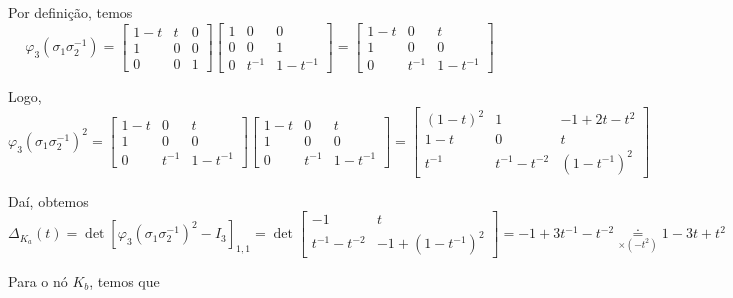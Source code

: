 	\par\vspace{0.3cm} Por definição, temos
	\begin{equation*}
	\varphi_3(\sigma_1\sigma_2^{-1}) = \begin{bmatrix}
	1-t & t & 0 \\
	1 & 0 & 0 \\
	0 & 0 & 1
	\end{bmatrix}\begin{bmatrix}
	1 & 0 & 0 \\
	0 & 0 & 1 \\
	0 & t^{-1} & 1-t^{-1}
	\end{bmatrix} = \begin{bmatrix}
	1-t & 0 & t \\
	1 & 0 & 0 \\
	0 & t^{-1} & 1-t^{-1}
	\end{bmatrix}
	\end{equation*}
	\par\vspace{0.3cm} Logo,
	\begin{equation*}
	\varphi_3(\sigma_1\sigma_2^{-1})^2 = \begin{bmatrix}
	1-t & 0 & t \\
	1 & 0 & 0 \\
	0 & t^{-1} & 1-t^{-1}
	\end{bmatrix}\begin{bmatrix}
	1-t & 0 & t \\
	1 & 0 & 0 \\
	0 & t^{-1} & 1-t^{-1}
	\end{bmatrix} = \begin{bmatrix}
	(1-t)^2 & 1 & -1 +2t-t^2 \\
	1-t & 0 & t \\
	t^{-1} & t^{-1}-t^{-2} & (1-t^{-1})^2
	\end{bmatrix}
	\end{equation*}
	\par\vspace{0.3cm} Daí, obtemos
	\begin{equation*}
	\Delta_{K_a}(t) = \det[\varphi_3(\sigma_1\sigma_2^{-1})^2 - I_3]_{1,1} = \det\begin{bmatrix}
	-1 & t \\
	t^{-1} - t^{-2} & -1+(1-t^{-1})^2
	\end{bmatrix} = -1+3t^{-1}-t^{-2} \underset{\times (-t^2)}{\doteq} 1-3t+t^2
	\end{equation*}
	\par\vspace{0.3cm} Para o nó $K_b$, temos que

